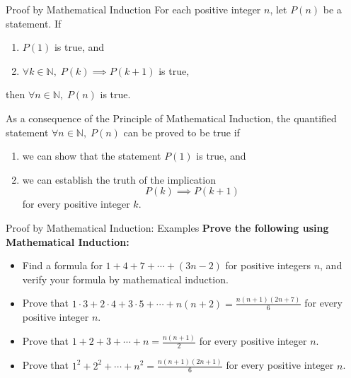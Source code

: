 \documentclass{beamer}
\begin{document}
\begin{frame}{Proof by Mathematical Induction}
For each positive integer $n$, let $P(n)$ be a statement.  
If 

\begin{enumerate}
    \item $P(1)$ is true, and
    \item $\forall k \in \mathbb{N}, \; P(k) \implies P(k+1)$ is true,
\end{enumerate}

then $\forall n \in \mathbb{N}, \; P(n)$ is true.

As a consequence of the Principle of Mathematical Induction, the quantified statement $\forall n \in \mathbb{N}, \; P(n)$ can be proved to be true if

\begin{enumerate}
    \item we can show that the statement $P(1)$ is true, and
    \item we can establish the truth of the implication
    \[
    P(k) \implies P(k+1)
    \]
    for every positive integer $k$.
\end{enumerate}

\end{frame}

\begin{frame}{Proof by Mathematical Induction: Examples}
\textbf{Prove the following using Mathematical Induction:}
\begin{itemize}
    \item Find a formula for $1 + 4 + 7 + \cdots + (3n-2)$ for positive integers $n$, and verify your formula by mathematical induction.
    \item Prove that $1 \cdot 3 + 2 \cdot 4 + 3 \cdot 5 + \cdots + n(n+2) = \frac{n(n+1)(2n+7)}{6}$ for every positive integer $n$.
    \item Prove that $1 + 2 + 3 + \cdots + n = \frac{n(n+1)}{2}$ for every positive integer $n$.
    \item Prove that $1^2 + 2^2 + \cdots + n^2 = \frac{n(n+1)(2n+1)}{6}$ for every positive integer $n$.
\end{itemize}

\end{frame}
\end{document}
